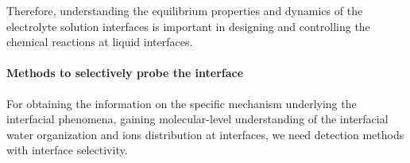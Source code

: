 Therefore, understanding the equilibrium properties and dynamics of the electrolyte solution interfaces 
is important in designing and controlling the chemical reactions at liquid interfaces.

\paragraph{Methods to selectively probe the interface}
For obtaining the information on the specific mechanism underlying the interfacial phenomena,
gaining molecular-level understanding of the interfacial water organization and ions distribution at interfaces,
we need detection methods with interface selectivity. 

